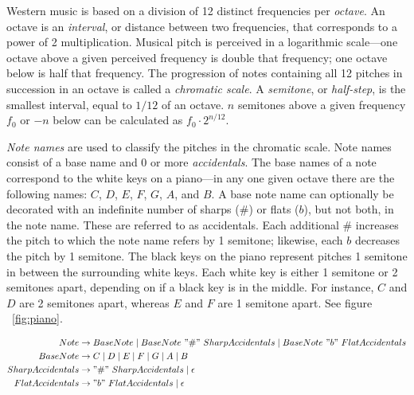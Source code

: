 Western music is based on a division of 12 distinct frequencies per \textit{octave}. An octave is an \textit{interval}, or distance between two frequencies, that corresponds to a power of 2 multiplication. Musical pitch is perceived in a logarithmic scale---one octave above a given perceived frequency is double that frequency; one octave below is half that frequency. The progression of notes containing all 12 pitches in succession in an octave is called a \textit{chromatic scale}. A \textit{semitone}, or \textit{half-step}, is the smallest interval, equal to $1/12$ of an octave. $n$ semitones above a given frequency $f_0$ or $-n$ below can be calculated as $f_0 \cdot 2^{n/12}$.

\textit{Note names} are used to classify the pitches in the chromatic scale. Note names consist of a base name and 0 or more \textit{accidentals}. The base names of a note correspond to the white keys on a piano---in any one given octave there are the following names: $C$, $D$, $E$, $F$, $G$, $A$, and $B$. A base note name can optionally be decorated with an indefinite number of sharps ($\#$) or flats ($b$), but not both, in the note name. These are referred to as accidentals. Each additional $\#$ increases the pitch to which the note name refers by 1 semitone; likewise, each $b$ decreases the pitch by 1 semitone. The black keys on the piano represent pitches 1 semitone in between the surrounding white keys. Each white key is either 1 semitone or 2 semitones apart, depending on if a black key is in the middle. For instance, $C$ and $D$ are 2 semitones apart, whereas $E$ and $F$ are 1 semitone apart. See figure ~\ref{fig:piano}.

\begin{align}
Note &\to BaseNote \mid BaseNote\ "\#"\ SharpAccidentals \mid BaseNote\ "b"\ FlatAccidentals \\
BaseNote &\to C \mid D \mid E \mid F \mid G \mid A \mid B \\
SharpAccidentals &\to "\#"\ SharpAccidentals \mid \epsilon \\
FlatAccidentals &\to "b"\ FlatAccidentals \mid \epsilon
\end{align}